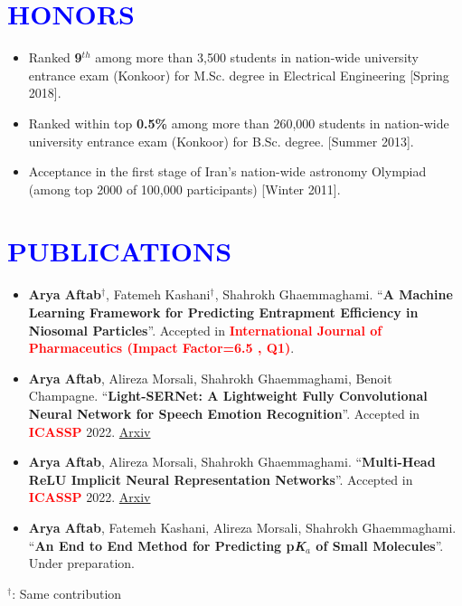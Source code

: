 \documentclass[letterpaper,11pt]{article}
\newcommand{\resumeSubHeadingListStart}{\begin{itemize}[leftmargin=0.0in, label={}]}
\begin{document}
	\section{\Large{\textcolor{blue}{HONORS}}}
	\begin{itemize}[itemsep=-2pt, parsep=5pt]
		\item Ranked \textbf{9$^{th}$} among more than 3,500 students in nation-wide university entrance exam (Konkoor) for M.Sc. degree in Electrical Engineering [Spring 2018].
		\item Ranked within top \textbf{0.5\%} among more than 260,000 students in nation-wide university entrance exam (Konkoor) for B.Sc. degree. [Summer 2013].
		\item Acceptance in the first stage of Iran’s nation-wide astronomy Olympiad (among top 2000 of 100,000 participants) [Winter 2011].
		
	\end{itemize}
	
	
	\section{\Large{\textcolor{blue}{PUBLICATIONS}}}
	\begin{itemize}[itemsep=0pt, parsep=5pt]
		\item \textbf{Arya Aftab$^{\dagger}$}, Fatemeh Kashani$^{\dagger}$, Shahrokh Ghaemmaghami. “\textbf{A Machine Learning Framework for Predicting Entrapment Efficiency in Niosomal Particles}”. Accepted in \textbf{\textcolor{red}{International Journal of Pharmaceutics (Impact Factor=6.5 , Q1)}}.
		\item \textbf{Arya Aftab}, Alireza Morsali, Shahrokh Ghaemmaghami, Benoit Champagne. “\textbf{Light-SERNet: A Lightweight Fully Convolutional Neural Network for Speech Emotion Recognition}”. Accepted in \textbf{\textcolor{red}{ICASSP}} 2022. \href{https://arxiv.org/pdf/2110.03435.pdf}{Arxiv {\raisebox{-0.1\height}\faExternalLink }}
		\item \textbf{Arya Aftab}, Alireza Morsali, Shahrokh Ghaemmaghami. “\textbf{Multi-Head ReLU Implicit Neural Representation Networks}”. Accepted in \textbf{\textcolor{red}{ICASSP}} 2022. \href{https://arxiv.org/pdf/2110.03448.pdf}{Arxiv {\raisebox{-0.1\height}\faExternalLink }}
		\item \textbf{Arya Aftab}, Fatemeh Kashani, Alireza Morsali, Shahrokh Ghaemmaghami. “\textbf{An End to End Method for Predicting p\textit{K}$_{a}$ of Small Molecules}”. Under preparation.
	\end{itemize}
	\vspace{-10pt}
	$^{\dagger}$: Same contribution
	
\end{document}
